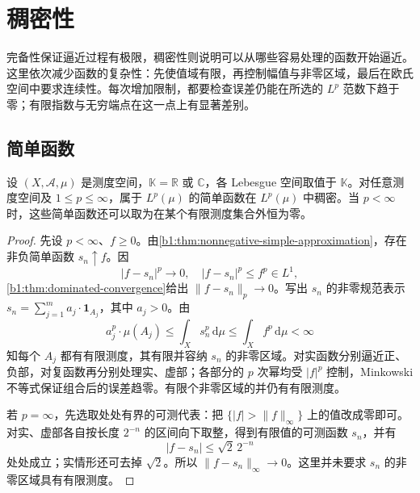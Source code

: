 \section{稠密性}
\label{b1:sec:1002}

完备性保证逼近过程有极限，稠密性则说明可以从哪些容易处理的函数开始逼近。这里依次减少函数的复杂性：先使值域有限，再控制幅值与非零区域，最后在欧氏空间中要求连续性。每次增加限制，都要检查误差仍能在所选的 \(L^p\) 范数下趋于零；有限指数与无穷端点在这一点上有显著差别。

\subsection{简单函数}
\label{b1:subsec:100201}

\begin{proposition}\label{b1:prop:lp-simple-dense}
设 \((X,\mathcal A,\mu)\) 是测度空间，\(\mathbb K=\mathbb R\) 或 \(\mathbb C\)，各 Lebesgue 空间取值于 \(\mathbb K\)。对任意测度空间及 \(1\leq p\leq\infty\)，属于 \(L^p(\mu)\) 的简单函数在 \(L^p(\mu)\) 中稠密。当 \(p<\infty\) 时，这些简单函数还可以取为在某个有限测度集合外恒为零。
\end{proposition}
\begin{proof}
先设 \(p<\infty\)、\(f\geq0\)。由\cref{b1:thm:nonnegative-simple-approximation}，存在非负简单函数 \(s_n\uparrow f\)。因
\[
 |f-s_n|^p\longrightarrow0,\quad |f-s_n|^p\leq f^p\in L^1,
\]
\cref{b1:thm:dominated-convergence}给出 \(\|f-s_n\|_p\to0\)。写出 \(s_n\) 的非零规范表示 \(s_n=\sum_{j=1}^ma_j\cdot\mathbf1_{A_j}\)，其中 \(a_j>0\)。由
\[
 a_j^p\cdot\mu(A_j)\leq\int_Xs_n^p\,\mathrm d\mu
 \leq\int_Xf^p\,\mathrm d\mu<\infty
\]
知每个 \(A_j\) 都有有限测度，其有限并容纳 \(s_n\) 的非零区域。对实函数分别逼近正、负部，对复函数再分别处理实、虚部；各部分的 \(p\) 次幂均受 \(|f|^p\) 控制，Minkowski 不等式保证组合后的误差趋零。有限个非零区域的并仍有有限测度。

若 \(p=\infty\)，先选取处处有界的可测代表：把 \(\{|f|>\|f\|_\infty\}\) 上的值改成零即可。对实、虚部各自按长度 \(2^{-n}\) 的区间向下取整，得到有限值的可测函数 \(s_n\)，并有
\[
 |f-s_n|\leq\sqrt2\,2^{-n}
\]
处处成立；实情形还可去掉 \(\sqrt2\)。所以 \(\|f-s_n\|_\infty\to0\)。这里并未要求 \(s_n\) 的非零区域具有有限测度。
\end{proof}

